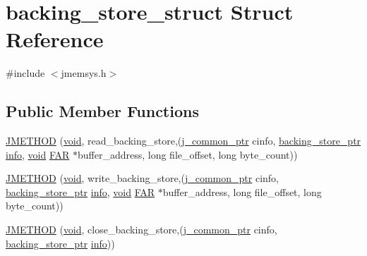 \hypertarget{structbacking__store__struct}{}\section{backing\+\_\+store\+\_\+struct Struct Reference}
\label{structbacking__store__struct}


{\ttfamily \#include $<$jmemsys.\+h$>$}

\subsection*{Public Member Functions}
\begin{DoxyCompactItemize}
\item 
\hyperlink{structbacking__store__struct_a22c5a1f420b61a5c3f48e857d61ceb35}{J\+M\+E\+T\+H\+O\+D} (\hyperlink{png_8h_aa8c59027f9ab2769342f248709d68d17}{void}, read\+\_\+backing\+\_\+store,(\hyperlink{jpeglib_8h_a1a177ab705cefea8f30ec31a48e62650}{j\+\_\+common\+\_\+ptr} cinfo, \hyperlink{jmemsys_8h_a2e08364903e928910fa9b65ea16c19f9}{backing\+\_\+store\+\_\+ptr} \hyperlink{jmemsys_8h_aae47c0f1d689d6cba5eb7077ca1299fa}{info}, \hyperlink{png_8h_aa8c59027f9ab2769342f248709d68d17}{void} \hyperlink{jmorecfg_8h_aef060b3456fdcc093a7210a762d5f2ed}{F\+A\+R} $\ast$buffer\+\_\+address, long file\+\_\+offset, long byte\+\_\+count))
\item 
\hyperlink{structbacking__store__struct_aa54343491f740a9d799eeb9c3e7e09d2}{J\+M\+E\+T\+H\+O\+D} (\hyperlink{png_8h_aa8c59027f9ab2769342f248709d68d17}{void}, write\+\_\+backing\+\_\+store,(\hyperlink{jpeglib_8h_a1a177ab705cefea8f30ec31a48e62650}{j\+\_\+common\+\_\+ptr} cinfo, \hyperlink{jmemsys_8h_a2e08364903e928910fa9b65ea16c19f9}{backing\+\_\+store\+\_\+ptr} \hyperlink{jmemsys_8h_aae47c0f1d689d6cba5eb7077ca1299fa}{info}, \hyperlink{png_8h_aa8c59027f9ab2769342f248709d68d17}{void} \hyperlink{jmorecfg_8h_aef060b3456fdcc093a7210a762d5f2ed}{F\+A\+R} $\ast$buffer\+\_\+address, long file\+\_\+offset, long byte\+\_\+count))
\item 
\hyperlink{structbacking__store__struct_a509740a807e120959a02d25ac245eea4}{J\+M\+E\+T\+H\+O\+D} (\hyperlink{png_8h_aa8c59027f9ab2769342f248709d68d17}{void}, close\+\_\+backing\+\_\+store,(\hyperlink{jpeglib_8h_a1a177ab705cefea8f30ec31a48e62650}{j\+\_\+common\+\_\+ptr} cinfo, \hyperlink{jmemsys_8h_a2e08364903e928910fa9b65ea16c19f9}{backing\+\_\+store\+\_\+ptr} \hyperlink{jmemsys_8h_aae47c0f1d689d6cba5eb7077ca1299fa}{info}))
\end{DoxyCompactItemize}
